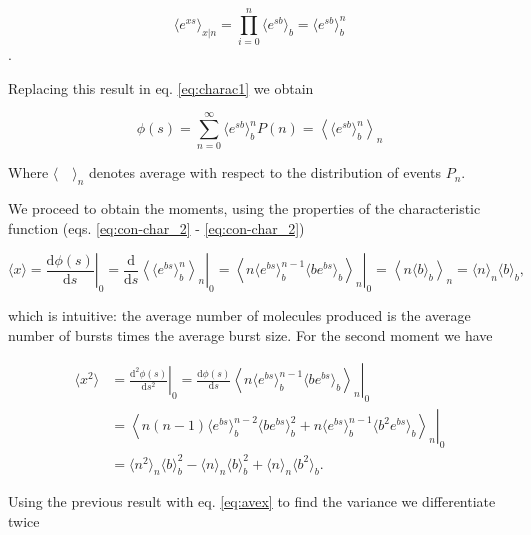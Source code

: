 \begin{equation*}
  \langle e^{xs}\rangle_{x|n} = \prod_{i=0}^n\langle e^{sb}\rangle_b = \langle e^{sb}\rangle_b^n
\end{equation*}.

Replacing this result in eq. \eqref{eq:charac1} we obtain

\begin{equation*}
  \phi(s) = \sum_{n=0}^\infty \langle e^{sb}\rangle_b^n P(n) = \left\langle\langle e^{sb}\rangle_b^n\right\rangle_n
\end{equation*}

Where $\langle\quad\rangle_n$ denotes average with respect to the distribution of events $P_n$.

We proceed to obtain the moments, using the properties of the characteristic function (eqs. \eqref{eq:con-char_2} - \eqref{eq:con-char_2})

\begin{equation}
  \label{eq:avex}
  \langle x\rangle = \left.\frac{\mathrm{d}\phi(s)}{\mathrm{d}s}\right|_0 = \left.\frac{\mathrm{d}}{\mathrm{d}s}\left\langle\langle e^{bs}\rangle_b^n\right\rangle_n\right|_0 = \left.\left\langle n\langle e^{bs}\rangle_b^{n-1}\langle b e^{bs}\rangle_b\right\rangle_n\right|_0 = \left\langle n\langle b\rangle_b\right\rangle_n = \langle n\rangle_n\langle b\rangle_b,
\end{equation}

which is intuitive: the average number of molecules produced is the average number of bursts times the average burst size. For the second moment we have

\begin{equation*}
  \begin{split}
    \langle x^2\rangle &= \left.\frac{\mathrm{d^2}\phi(s)}{\mathrm{d}s^2}\right|_0 = \left.\frac{\mathrm{d}\phi(s)}{\mathrm{d}s}\left\langle n\langle e^{bs}\rangle_b^{n-1}\langle b e^{bs}\rangle_b\right\rangle_n\right|_0\\
  &= \left.\left\langle n(n-1)\langle e^{bs}\rangle^{n-2}_b\langle be^{bs}\rangle^2_b+n\langle e^{bs}\rangle^{n-1}_b\langle b^2e^{bs}\rangle_b\right\rangle_n\right|_0\\
  &=\langle n^2\rangle_n\langle b\rangle_b^2-\langle n\rangle_n\langle b\rangle_b^2+\langle n\rangle_n\langle b^2\rangle_b.
  \end{split}
\end{equation*}

Using the previous result with eq. \eqref{eq:avex} to find the variance we differentiate twice


